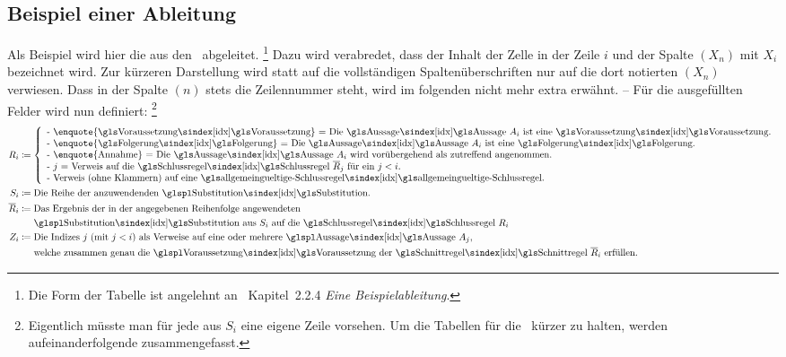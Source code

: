 {\subsection{Beispiel einer Ableitung}%
\label{sub:BeispielAbleitung}

Als Beispiel wird hier die  aus den \Basisregeln\ abgeleitet.%
\footnote{%
	Die Form der Tabelle ist angelehnt an~\cite{bib:NatuerlichesSchliessen} Kapitel~2.2.4 \emph{Eine Beispielableitung}.
}
Dazu wird verabredet, dass  der Inhalt der Zelle in der Zeile $i$ und der Spalte $(X_n)$ mit $X_i$ bezeichnet wird.
Zur kürzeren Darstellung wird statt auf die vollständigen Spaltenüberschriften nur auf die dort notierten $(X_n)$ verwiesen. Dass in der Spalte $(n)$ stets die Zeilennummer steht, wird im folgenden nicht mehr extra erwähnt.
-- Für die ausgefüllten Felder wird nun definiert:%
\footnote{%
	Eigentlich müsste man für jede  aus $S_i$ eine eigene Zeile vorsehen.
	Um die Tabellen für die \Beweise\ kürzer zu halten, werden aufeinanderfolgende  zusammengefasst.
}
\begin{align}
	R_i & \defeq
	\left\{
		\begin{array}{l}
			\text{- \enquote{\Voraussetzung} = Die \Aussage\ $A_i$ ist eine \Voraussetzung.}\\
			\text{- \enquote{\Folgerung} = Die \Aussage\ $A_i$ ist eine \Folgerung.}\\
			\text{- \enquote{Annahme} = Die \Aussage\ $A_i$ wird vorübergehend als zutreffend angenommen.}\\
			\text{- $j$ = Verweis auf die \glsIdx{Schlussregel} $\overline{R}_j$ für ein $j < i$.}\\
			\text{- Verweis (ohne Klammern) auf eine \glsIdx{allgemeingueltige-Schlussregel}.}
		\end{array}
	\right.
	\\
	S_i & \defeq \text{Die Reihe der anzuwendenden \glsIdxPl{Substitution}.}
	\\
	\overline{R}_i & \defeq \text{Das Ergebnis der in der angegebenen Reihenfolge angewendeten}\\
	& \quad\;\; \text{\glsIdxPl{Substitution} aus $S_i$ auf die \glsIdx{Schlussregel} $R_i$}
	\\
	Z_i & \defeq \text{Die Indizes $j$ (mit $j < i$) als Verweise auf eine oder mehrere \Aussagen\ $A_j$,}\\
	& \quad\;\; \text{welche zusammen genau die \Voraussetzungen\ der \glsIdx{Schnittregel} } \overline{R}_i \text{ erfüllen.}

\end{align}}
